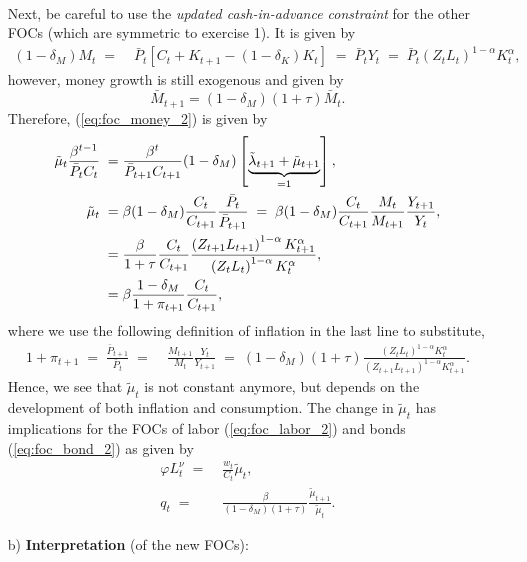 \documentclass[a4paper, 12pt]{article}
\begin{document}
\begin{Answer}
\begin{small}
\begin{enumerate}
\begin{align}
			\end{align}%
			Next, be careful to use the \emph{updated cash-in-advance constraint} for the other FOCs (which are symmetric to exercise 1). It is given by%
			\begin{align*}%
				(1-\delta_M) M_t \; = & \; \bar{P}_t \left[C_t + K_{t+1} - (1-\delta_K)K_t\right] \; = \; \bar{P}_t Y_t \; = \; \bar{P}_t \left(Z_t L_t\right)^{1-\alpha} K_t^\alpha,%
			\end{align*}%
			however, money growth is still exogenous and given by $$\bar{M}_{t+1} = (1-\delta_M)(1+\tau)\bar{M}_t.$$ Therefore, (\ref{eq:foc_money_2}) is given by%
			\begin{align}%
				\tilde{\mu}_t \frac{\beta^{t-1}}{\bar{P}_t C_t} \; = & \; \frac{\beta^t}{\bar{P}_{t+1} C_{t+1}} (1-\delta_M) \left[\underbrace{\tilde{\lambda}_{t+1}+\tilde{\mu}_{t+1}}_{=1}\right],\notag\\%
				\tilde{\mu}_t \; = & \; \beta (1-\delta_M) \frac{C_t}{C_{t+1}} \frac{\bar{P}_t}{\bar{P}_{t+1}} \; = \; \beta (1-\delta_M) \frac{C_t}{C_{t+1}} \frac{M_t}{M_{t+1}} \frac{Y_{t+1}}{Y_t},\notag\\%
				= & \; \frac{\beta}{1+\tau} \frac{C_{t}}{C_{t+1}} \frac{\left(Z_{t+1} L_{t+1}\right)^{1-\alpha} K_{t+1}^\alpha}{\left(Z_t L_t\right)^{1-\alpha} K_t^\alpha},\notag\\%
				= & \; \beta \frac{1-\delta_M}{1+\pi_{t+1}} \frac{C_{t}}{C_{t+1}},\label{eq:foc_new_money}%
			\end{align}%
			where we use the following definition of inflation in the last line to substitute,
			\begin{align}%
				1+\pi_{t+1} \; = \; \frac{\bar{P}_{t+1}}{\bar{P}_t} \; = & \; \frac{M_{t+1}}{M_t}  \frac{Y_{t}}{Y_{t+1}} \; = \; \left(1-\delta_M\right) \left(1+\tau\right) \frac{\left(Z_t L_t\right)^{1-\alpha} K_t^\alpha}{\left(Z_{t+1}L_{t+1}\right)^{1-\alpha}K_{t+1}^\alpha}.%
			\end{align}%
			Hence, we see that $\tilde{\mu}_t$ is not constant anymore, but depends on the development of both inflation and consumption. The change in $\tilde{\mu}_t$ has implications for the FOCs of labor (\ref{eq:foc_labor_2}) and bonds (\ref{eq:foc_bond_2}) as given by%
			\begin{align}%
				\varphi L_t^\nu \; = & \; \frac{w_t}{C_t} \tilde{\mu}_t,\\%
				q_t \; = & \; \frac{\beta}{(1-\delta_M)(1+\tau)} \frac{\tilde{\mu}_{t+1}}{\tilde{\mu}_t}.%
			\end{align}%
			\item[b)] \textbf{Interpretation} (of the new FOCs):%

\end{enumerate}
\end{small}
\end{Answer}
\end{document}
